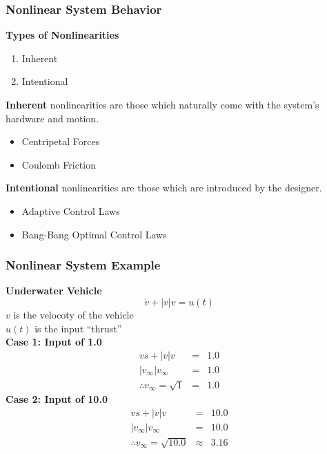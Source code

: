 \documentclass[11pt,handout]{beamer}   %
\begin{document}
\begin{frame}
\frametitle{Nonlinear System Behavior}
\textbf{Types of Nonlinearities}
\begin{enumerate}
\item Inherent 
\item Intentional
\end{enumerate}

\textbf{Inherent} nonlinearities are those which naturally come with the system's hardware and motion.\\
\begin{itemize}
\item Centripetal Forces
\item Coulomb Friction
\end{itemize}
\textbf{Intentional} nonlinearities are those which are introduced by the designer.\\
\begin{itemize}
\item Adaptive Control Laws
\item Bang-Bang Optimal Control Laws
\end{itemize}
\end{frame}


\begin{frame}
\frametitle{Nonlinear System Example}
\textbf{Underwater Vehicle}
\begin{equation}
\dot{v} + |v|v = u(t)
\end{equation}
$v$ is the velocoty of the vehicle\\
$u(t)$ is the input ``thrust''\\
\textbf{Case 1: Input of 1.0}\\
\begin{equation*}
\begin{aligned}
v s + |v|v &=& 1.0\\
|v_{\infty}|v_{\infty} &=& 1.0\\
\therefore v_{\infty} = \sqrt{1} &=& 1.0
\end{aligned}
\end{equation*}
\textbf{Case 2: Input of 10.0}\\
\begin{equation*}
\begin{aligned}
v s + |v|v &=& 10.0\\
|v_{\infty}|v_{\infty} &=& 10.0\\
\therefore v_{\infty} = \sqrt{10.0} &\approx& 3.16
\end{aligned}
\end{equation*}
\end{frame}
\end{document}
